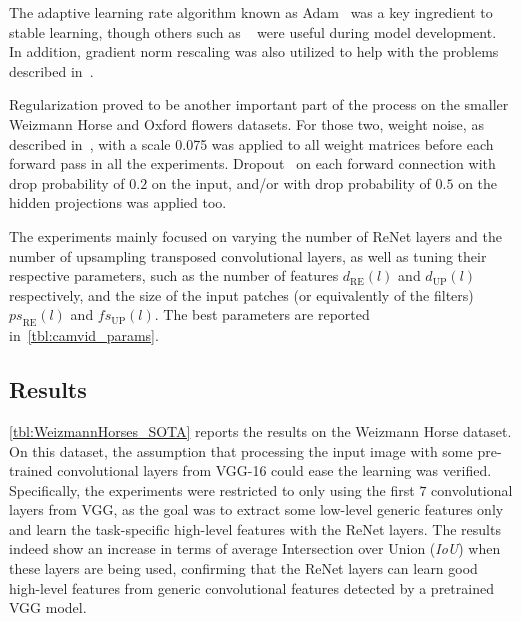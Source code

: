 The adaptive learning rate algorithm known as Adam~\cite{Kingma2014} was a
key ingredient to stable learning, though others such as ~\cite{Zeiler-2012}
were useful during model development. In addition, gradient norm rescaling was
also utilized to help with the problems described in~\cite{bengio2013advances}.

Regularization proved to be another important part of the process on the
smaller Weizmann Horse and Oxford flowers datasets. For those two, weight
noise, as described in~\cite{Graves2011}, with a scale 0.075 was applied to all
weight matrices before each forward pass in all the experiments.
Dropout~\cite{Srivastava14} on each forward connection with drop probability of
$0.2$ on the input, and/or with drop probability of $0.5$ on the hidden
projections was applied too.

The experiments mainly focused on varying the number of ReNet layers and the
number of upsampling transposed convolutional layers, as well as tuning their
respective parameters, such as the number of features $d_{\text{RE}}(l)$ and
$d_{\text{UP}}(l)$ respectively, and the size of the input patches (or
equivalently of the filters) ${ps}_{\text{RE}}(l)$ and ${fs}_{\text{UP}}(l)$.
The best parameters are reported in~\autoref{tbl:camvid_params}.

%


\subsection{Results}\label{sec:reseg_results}

\autoref{tbl:WeizmannHorses_SOTA} reports the results on the Weizmann
Horse dataset. On this dataset, the assumption that processing the input image
with some pre-trained convolutional layers from VGG-16 could ease the learning
was verified. Specifically, the experiments were restricted to only using the
first $7$ convolutional layers from VGG, as the goal was to extract some
low-level generic features only and learn the task-specific high-level features
with the ReNet layers. The results indeed show an increase in terms of average
Intersection over Union (\emph{IoU}) when these layers are being used,
confirming that the ReNet layers can learn good high-level features from
generic convolutional features detected by a pretrained VGG model.

